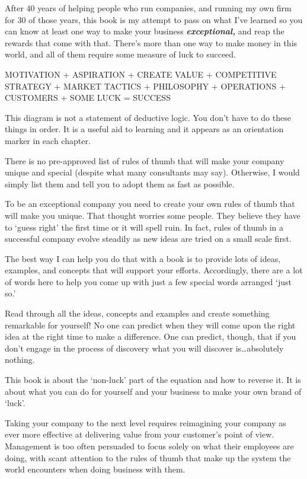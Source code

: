 \documentclass[
]{book}
\begin{document}
After 40 years of helping people who run companies, and running my own firm for 30 of those years, this book is my attempt to pass on what I've learned so you can know at least one way to make your business \textbf{\emph{exceptional,}} and reap the rewards that come with that. There's more than one way to make money in this world, and all of them require some measure of luck to succeed.

{MOTIVATION}
{+}
{ASPIRATION}
{+}
{CREATE VALUE}
{+}
{COMPETITIVE STRATEGY }
{+}
{MARKET TACTICS}
{+}
{PHILOSOPHY}
{+}
{OPERATIONS}
{+}
{CUSTOMERS}
{+}
{SOME LUCK}
{=}
{SUCCESS}

This diagram is not a statement of deductive logic. You don't have to do these things in order. It is a useful aid to learning and it appears as an orientation marker in each chapter.

There is no pre-approved list of rules of thumb that will make your company unique and special (despite what many consultants may say). Otherwise, I would simply list them and tell you to adopt them as fast as possible.

To be an exceptional company you need to create your own rules of thumb that will make you unique. That thought worries some people. They believe they have to `guess right' the first time or it will spell ruin. In fact, rules of thumb in a successful company evolve steadily as new ideas are tried on a small scale first.

The best way I can help you do that with a book is to provide lots of ideas, examples, and concepts that will support your efforts. Accordingly, there are a lot of words here to help you come up with just a few special words arranged `just so.'

Read through all the ideas, concepts and examples and create something remarkable for yourself! No one can predict when they will come upon the right idea at the right time to make a difference. One can predict, though, that if you don't engage in the process of discovery what you will discover is\ldots absolutely nothing.

This book is about the `non-luck' part of the equation and how to reverse it. It is about what you can do for yourself and your business to make your own brand of `luck'.

Taking your company to the next level requires reimagining your company as ever more effective at delivering value from your customer's point of view. Management is too often persuaded to focus solely on what their employees are doing, with scant attention to the rules of thumb that make up the system the world encounters when doing business with them.
\end{document}
